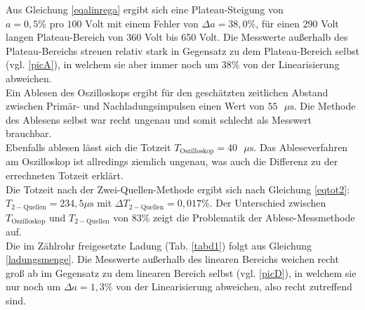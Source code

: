 Aus Gleichung \ref{eqalinrega} ergibt sich eine Plateau-Steigung von $a=0,5\% \text{ pro } 
100 \text{ Volt}$ mit einem Fehler von $\Delta a=38,0\%$, für einen 290 Volt langen
Plateau-Bereich von 360 Volt bis 650 Volt. Die Messwerte außerhalb des Plateau-Bereichs streuen relativ 
stark in Gegensatz zu dem Plateau-Bereich selbst (vgl. \ref{picA}), in welchem sie aber immer noch um $38\%$
von der Linearisierung abweichen. \\
Ein Ablesen des Oszilloskops ergibt für den geschätzten zeitlichen Abstand zwischen Primär- und
Nachladungsimpulsen einen Wert von $55\text{ } \mu\text{s}$. Die Methode des Ablesens selbst war recht ungenau
und somit schlecht als Messwert brauchbar.\\
Ebenfalls ablesen lässt sich die Totzeit $T_{\text{Oszilloskop}}=40\text{ }\mu\text{s}$. Das Ableseverfahren am Oszilloskop ist allredings ziemlich ungenau, was  auch die Differenz zu der errechneten Totzeit erklärt. \\ Die Totzeit nach
der Zwei-Quellen-Methode ergibt sich nach Gleichung \ref{eqtot2}: $T_{2-\text{Quellen}}=234,5\mu\text{s}$ 
mit $\Delta T_{2-\text{Quellen}}=0,017\%$. Der Unterschied zwischen $T_{\text{Oszilloskop}}$ und $T_{2-\text{Quellen}}$
von $83\%$ zeigt die Problematik der Ablese-Messmethode auf.\\
Die im Zählrohr freigesetzte Ladung (Tab. \ref{tabd1}) folgt aus Gleichung \ref{ladungsmenge}. 
Die Messwerte außerhalb des linearen Bereichs weichen recht groß ab im Gegensatz zu dem linearen Bereich 
selbst (vgl. \ref{picD}), in welchem sie nur noch um $\Delta a=1,3\%$ von der Linearisierung abweichen,
also recht zutreffend sind.  
% 
\FloatBarrier